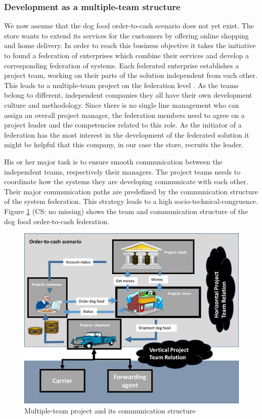 \subsubsection{Development as a multiple-team structure}
We now assume that the dog food order-to-cash scenario does not yet exist. The store wants to extend its services for the customers by offering online shopping and home delivery. In order to reach this business objective it takes the initiative to found a federation of enterprises which combine their services and develop a corresponding federation of systems.
Each federated enterprise establishes a project team, working on their parts of the solution independent from each other. This leads to a multiple-team project on the federation level \cite{book:OrgPatternsAgile}. As the teams belong to different, independent companies they all have their own development culture and methodology.
Since there is no single line management who can assign an overall project manager, the federation members need to agree on a project leader and the competencies related to this role. As the initiator of a federation has the most interest in the development of the federated solution it might be helpful that this company, in our case the store, recruits the leader.

His or her major task is to ensure smooth communication between the independent teams, respectively their managers. The project teams needs to coordinate how the systems they are developing communicate with each other. Their major communication paths are predefined by the communication structure of the system federation. This strategy leads to a high socio-technical-congruence. Figure \ref{fig:Multiple-team} (CS: no missing) shows the team and communication structure of the dog food order-to-cash federation.

\begin{figure}[htbp]
	\centering
	\includegraphics[width=0.6\linewidth] {Figures/Chapter5/Project/MultipleTeam.jpg}
	\caption[Multiple-team project and its communication structure]{Multiple-team project and its communication structure}
	\label{fig:Multiple-team}
\end{figure}

